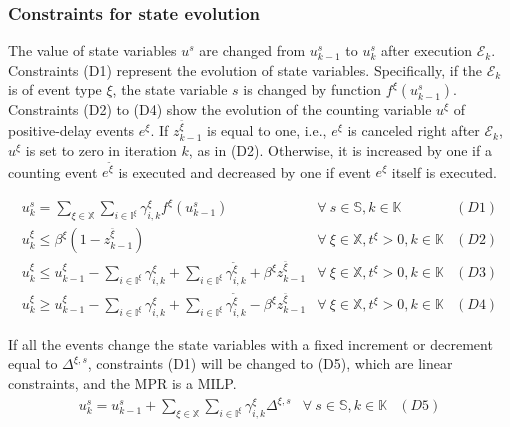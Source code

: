 \documentclass[]{interact}
\theoremstyle{plain}%
\theoremstyle{definition}
\theoremstyle{remark}
\begin{document}
\subsubsection{Constraints  for  state evolution}\label{sec:const_E}
The value of state variables $u^{s}$ are changed from $u^{s}_{k-1}$ to $u^{s}_{k}$ after execution $\mathcal{E}_k$. Constraints (D1) represent the evolution of state variables. Specifically, if the $\mathcal{E}_{k}$ is of event type $\xi$, the state variable $s$ is changed by function $f^{\xi}(u^s_{k-1})$. Constraints (D2) to (D4) show the evolution of the counting variable $u^{\xi}$ of positive-delay events $e^{\xi}$. If $z^{\bar{\xi}}_{k-1}$ is equal to one, i.e., $e^{\xi}$ is canceled right after $\mathcal{E}_k$, $u^{\xi}$ is set to zero in iteration $k$, as in (D2). Otherwise, it is increased by one if a counting event $e^{\tilde{\xi}}$ is executed and decreased by one if event $e^{\xi}$ itself is executed.

\begin{eqnarray}
u^{s}_{k} =  \sum_{\xi\in \mathbb{X}} \sum_{i\in \mathbb{I}^{\xi}} \gamma^{\xi}_{i,k} f^{\xi}(u^s_{k-1})& \forall\ s\in \mathbb{S},k\in \mathbb{K}&(D1)\nonumber\\
u^{\xi}_{k}\le \beta^{\xi}(1-z^{\bar{\xi}}_{k-1}) & \forall\ \xi\in\mathbb{X},t^{\xi}>0,k\in \mathbb{K}&(D2)\nonumber\\
u^{\xi}_{k}\le u^{\xi}_{k-1} - \sum_{i\in \mathbb{I}^{\xi}} \gamma^{\xi}_{i,k} + \sum_{i\in \mathbb{I}^{\xi}} \gamma^{\tilde{\xi}}_{i,k} + \beta^{\xi}z^{\bar{\xi}}_{k-1}& \forall\ \xi\in\mathbb{X},t^{\xi}>0, k\in \mathbb{K}&(D3)\nonumber\\
u^{\xi}_{k}\ge u^{\xi}_{k-1} - \sum_{i\in \mathbb{I}^{\xi}} \gamma^{\xi}_{i,k} + \sum_{i\in \mathbb{I}^{\xi}} \gamma^{\tilde{\xi}}_{i,k}- \beta^{\xi}z^{\bar{\xi}}_{k-1}& \forall\ \xi\in\mathbb{X},t^{\xi}>0,k\in \mathbb{K}&(D4)\nonumber
\end{eqnarray}

If all the events change the state variables with a fixed increment or decrement equal to $\Delta^{\xi,s}$, constraints (D1) will be changed to (D5), which are linear constraints, and the MPR is a MILP. 
 \begin{eqnarray}
 u^{s}_{k} = u^s_{k-1} + \sum_{\xi\in \mathbb{X}} \sum_{i\in \mathbb{I}^{\xi}} \gamma^{\xi}_{i,k} \Delta^{\xi,s}& \forall\ s\in \mathbb{S},k\in \mathbb{K}&(D5)\nonumber
 \end{eqnarray}
 
\end{document}
